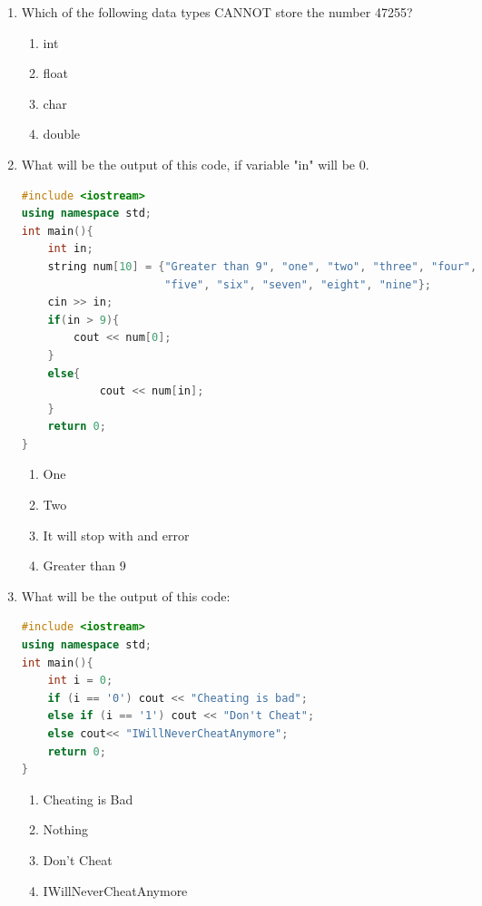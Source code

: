 \documentclass[10pt]{article}
\begin{document}
\begin{enumerate}


\item Which of the following data types CANNOT store the number 47255?
\begin{multicols}{4}
\begin{enumerate}
    \item int
    \item float
    \item char 
    \item double
\end{enumerate}
\end{multicols}



\item What will be the output of this code, if variable "in" will be 0.
\begin{lstlisting}[language=C++]
#include <iostream>
using namespace std;
int main(){
    int in;
    string num[10] = {"Greater than 9", "one", "two", "three", "four",
                      "five", "six", "seven", "eight", "nine"};
    cin >> in;
    if(in > 9){
        cout << num[0];
    }
    else{
            cout << num[in];
    }
    return 0;
}
\end{lstlisting}
\begin{multicols}{4}
\begin{enumerate}
    \item One
    \item Two
    \item It will stop with and error 
    \item Greater than 9 
\end{enumerate}
\end{multicols}





\item What will be the output of this code:
\begin{lstlisting}[language=C++]
#include <iostream>
using namespace std;
int main(){
    int i = 0;
    if (i == '0') cout << "Cheating is bad";
    else if (i == '1') cout << "Don't Cheat";
    else cout<< "IWillNeverCheatAnymore";
    return 0;
}
\end{lstlisting}
\begin{multicols}{4}
\begin{enumerate}
    \item Cheating is Bad
    \item Nothing
    \item Don't Cheat 
    \item IWillNeverCheatAnymore 
\end{enumerate}
\end{multicols}





\end{enumerate}
\end{document}
